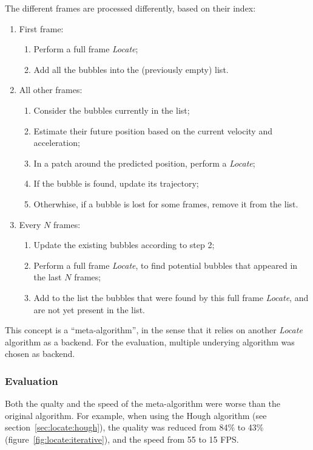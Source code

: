 The different frames are processed differently, based on their index:
\begin{enumerate}
	\itemsep 0em
	\item First frame:
	      \begin{enumerate}
		      \itemsep 0em
		      \item Perform a full frame \textit{Locate};
		      \item Add all the bubbles into the (previously empty) list.
	      \end{enumerate}
	\item All other frames:
	      \begin{enumerate}
		      \itemsep 0em
		      \item Consider the bubbles currently in the list;
		      \item Estimate their future position based on the current velocity and acceleration;
		      \item In a patch around the predicted position, perform a \textit{Locate};
		      \item If the bubble is found, update its trajectory;
		      \item Otherwhise, if a bubble is lost for some frames, remove it from the list.
	      \end{enumerate}
	\item Every $N$ frames:
	      \begin{enumerate}
		      \itemsep 0em
		      \item Update the existing bubbles according to step 2;
		      \item Perform a full frame \textit{Locate}, to find potential bubbles that appeared in the last $N$ frames;
		      \item Add to the list the bubbles that were found by this full frame \textit{Locate}, and are not yet present in the list.
	      \end{enumerate}
\end{enumerate}

This concept is a ``meta-algorithm'', in the sense that it relies on another \textit{Locate} algorithm as a backend.
For the evaluation, multiple underying algorithm was chosen as backend.

\subsubsection{Evaluation}

Both the qualty and the speed of the meta-algorithm were worse than the original algorithm.
For example, when using the Hough algorithm (see section~\ref{sec:locate:hough}), the quality was reduced from 84\% to 43\% (figure~\ref{fig:locate:iterative}), and the speed from 55 to 15 FPS.

